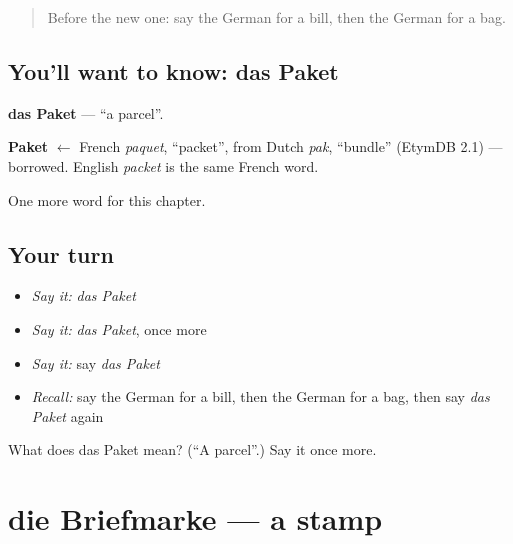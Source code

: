 \label{lesson:GE-C158-paket}



\begin{quote}
Before the new one: say the German for a bill, then the German for a bag.
\end{quote}

\subsection*{You'll want to know: das Paket}
\textbf{das Paket} — \textquotedblleft{}a parcel\textquotedblright{}.

\begin{cousinweb}
\textbf{Paket} $\leftarrow$ French \emph{paquet}, \textquotedblleft{}packet\textquotedblright{}, from Dutch \emph{pak}, \textquotedblleft{}bundle\textquotedblright{} (EtymDB 2.1) — borrowed. English \emph{packet} is the same French word.
\end{cousinweb}

\begin{grammarlens}[title={What you've built}]
One more word for this chapter.
\end{grammarlens}

\subsection*{Your turn}
\begin{itemize}
\raggedright
  \item \emph{Say it:} \emph{das Paket}
  \item \emph{Say it:} \emph{das Paket}, once more
  \item \emph{Say it:} say \emph{das Paket}
  \item \emph{Recall:} say the German for a bill, then the German for a bag, then say \emph{das Paket} again
\end{itemize}

\begin{tcolorbox}[breakable,colback=teal!4,colframe=teal!35!black,title={Before you move on}]
What does das Paket mean? (\textquotedblleft{}A parcel\textquotedblright{}.) Say it once more.
\end{tcolorbox}
\section[die Briefmarke]{die Briefmarke — a stamp}

\label{lesson:GE-C158-briefmarke}



